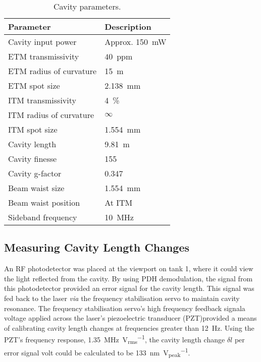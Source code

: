 \begin{table}
  \centering
  \begin{tabular}{|l|l|}
    \hline
    \textbf{Parameter}        & \textbf{Description}	      \\ \hline
    Cavity input power      & Approx. \SI{150}{\milli\watt}   \\ \hline
    \gls{ETM} transmissivity      & $40$~ppm                  \\ \hline
    \gls{ETM} radius of curvature & \SI{15}{\meter}           \\ \hline
    \gls{ETM} spot size           & \SI{2.138}{\milli \meter} \\ \hline
    \gls{ITM} transmissivity      & \SI{4}{\%}                \\ \hline
    \gls{ITM} radius of curvature & $\infty$                  \\ \hline
    \gls{ITM} spot size           & \SI{1.554}{\milli \meter} \\ \hline
    Cavity length           & \SI{9.81}{\meter}               \\ \hline
    Cavity finesse          & \SI{155}{}                      \\ \hline
    Cavity g-factor         & \SI{0.347}{}                    \\ \hline
    Beam waist size         & \SI{1.554}{\milli \meter}       \\ \hline
    Beam waist position     & At \gls{ITM}                    \\ \hline
    Sideband frequency      & \SI{10}{\mega\hertz}            \\ \hline
  \end{tabular}
  \caption{\label{tab:cavity-parameters}Cavity parameters.}
\end{table}

\subsection{Measuring Cavity Length Changes}

An RF photodetector was placed at the viewport on tank 1, where it could view the light reflected from the cavity. By using PDH demodulation, the signal from this photodetector provided an error signal for the cavity length. This signal was fed back to the laser \emph{via} the frequency stabilisation servo to maintain cavity resonance. The frequency stabilisation servo's high frequency feedback signal\textemdash a voltage applied across the laser's piezoelectric transducer (PZT)\textemdash provided a means of calibrating cavity length changes at frequencies greater than \SI{12}{\hertz}. Using the PZT's frequency response, \SI{1.35}{\mega\hertz \per \volt_{rms}}, the cavity length change $\delta l$ per error signal volt could be calculated to be \SI{133}{\nano\meter \per \volt_{peak}}.

